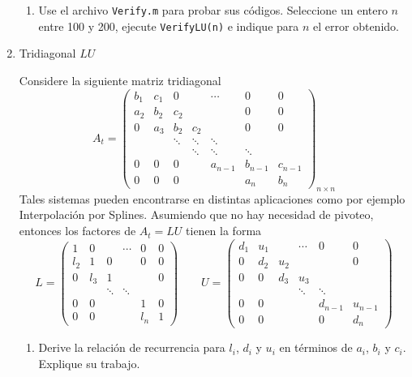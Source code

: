 \documentclass[12pt]{article}
\begin{document}
\begin{enumerate}
\begin{enumerate}
\item Use el archivo {\tt Verify.m} para probar sus c\'odigos. Seleccione un entero $n$ entre 100 y 
200, ejecute {\tt VerifyLU(n)}  e indique para $n$ el error obtenido.

\end{enumerate}

\item Tridiagonal $LU$

Considere la siguiente matriz tridiagonal
$$
A_t = \left(\begin{array}{ccccccc}
               b_1 & c_1 & 0 & & \cdots & 0 & 0 \\
               a_2 & b_2 & c_2 & & & 0 & 0 \\
               0 & a_3 & b_2 & c_2 & & 0 & 0 \\
                &  & \ddots &\ddots &\ddots &  &  \\
                 & &  & \ddots &\ddots &\ddots &   \\
                0 & 0 & 0 & & a_{n-1} & b_{n-1} & c_{n-1} \\
                0 & 0 & 0 & &  & a_{n} & b_{n} 
            \end{array}\right)_{n \times n}
$$
Tales sistemas pueden encontrarse en distintas aplicaciones como por ejemplo Interpolaci\'on por 
Splines. Asumiendo que no hay necesidad de pivoteo, entonces los factores de $A_t=LU$ tienen la 
forma
$$
L = \left(\begin{array}{cccccc}
             1 & 0 &  & \cdots & 0 & 0 \\
             l_2 & 1 & 	0 &  & 0 & 0\\
             0 & l_3 & 1 &  & & 0\\
             & & \ddots & \ddots & & \\
             0 & 0  & & & 1 & 0\\
             0 & 0 & & & l_n & 1             
          \end{array}\right) \qquad
U = \left(\begin{array}{cccccc}
             d_1 & u_1 &  & \cdots & 0 & 0 \\
             0 & d_2 & 	u_2 &  &  & 0\\
             0 & 0 & d_3 & u_3 & & \\
             & &  & \ddots & \ddots &  \\
             0 & 0  & & & d_{n-1} & u_{n-1}\\
             0 & 0 & & & 0 & d_n             
          \end{array}\right)
$$
\begin{enumerate}
   \item Derive la relaci\'on de recurrencia para $l_i$, $d_i$ y $u_i$ en t\'erminos de $a_i$, 
$b_i$ y $c_i$. Explique su trabajo.



\end{enumerate}
\end{enumerate}
\end{document}

